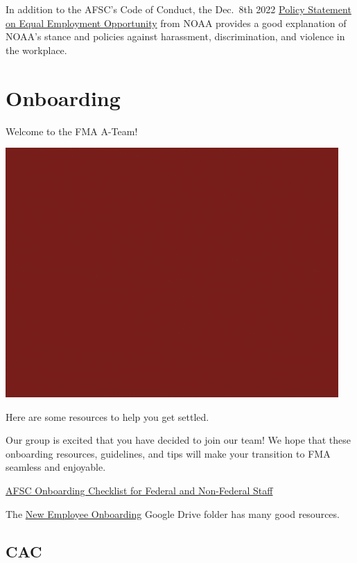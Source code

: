 \documentclass[
  letterpaper,
  DIV=11,
  numbers=noendperiod]{scrreprt}
\begin{document}
In addition to the AFSC's Code of Conduct, the Dec.~8th 2022
\href{https://www.noaa.gov/organization/inclusion-and-civil-rights/policy-statement-on-equal-employment-opportunity}{Policy
Statement on Equal Employment Opportunity} from NOAA provides a good
explanation of NOAA's stance and policies against harassment,
discrimination, and violence in the workplace.


\hypertarget{onboarding}{%
\chapter{Onboarding}\label{onboarding}}

Welcome to the FMA A-Team!

\includegraphics[scale=1,bb=0 0 30 30]{_img/ateamgiffy.gif}

Here are some resources to help you get settled.

Our group is excited that you have decided to join our team! We hope
that these onboarding resources, guidelines, and tips will make your
transition to FMA seamless and enjoyable.

\href{https://drive.google.com/file/d/1Gxg-tw76NeptYFkya7M6JSyxsy31mmAu/view?usp=sharing}{AFSC
Onboarding Checklist for Federal and Non-Federal Staff}

The
\href{https://drive.google.com/drive/folders/1aZcoJooHxNMh4kjCiv4WUgpDtszub1PI}{New
Employee Onboarding} Google Drive folder has many good resources.

\hypertarget{cac}{%
\section{CAC}\label{cac}}
\end{document}
